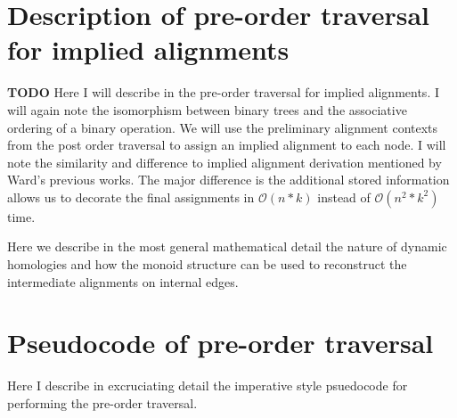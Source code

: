 \documentclass[11pt]{article}
\begin{document}
\section{Description of pre-order traversal for implied alignments}
\textbf{TODO}
Here I will describe in the pre-order traversal for implied alignments. I will again note the isomorphism between binary trees and the associative ordering of a binary operation. 
We will use the preliminary alignment contexts from the post order traversal to assign an implied alignment to each node. 
I will note the similarity and difference to implied alignment derivation mentioned by Ward's previous works. 
The major difference is the additional stored information allows us to decorate the final assignments in $\mathcal{O}(n*k)$ instead of $\mathcal{O}(n^2*k^2)$ time.

Here we describe in the most general mathematical detail the nature of dynamic homologies and how the monoid structure can be used to reconstruct the intermediate alignments on internal edges.


\section{Pseudocode of pre-order traversal}
Here I describe in excruciating detail the imperative style psuedocode for performing the pre-order traversal.
\end{document}

